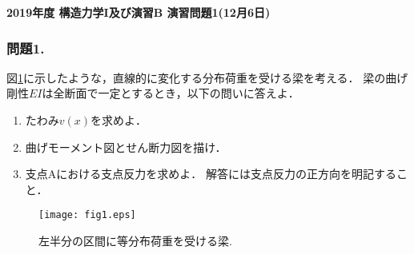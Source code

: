\documentclass[10pt,a4j]{jarticle}
\newlength{\minitwocolumn}
\begin{document}
\newcommand{\fat}[1]{\mbox{\boldmath $#1$}}
\newcommand{\D}{\partial}
\newcommand{\w}{\omega}
\newcommand{\ga}{\alpha}
\newcommand{\gb}{\beta}
\newcommand{\gx}{\xi}
\newcommand{\gz}{\zeta}
\newcommand{\vhat}[1]{\hat{\fat{#1}}}
\newcommand{\spc}{\vspace{0.7\baselineskip}}
\newcommand{\halfspc}{\vspace{0.3\baselineskip}}

\pagestyle{empty}
\newcommand{\twofig}[2]
 {
   \begin{figure}[h]
     \begin{minipage}[t]{\minitwocolumn}
         \begin{center}   #1
         \end{center}
     \end{minipage}
         \hspace{\columnsep}
     \begin{minipage}[t]{\minitwocolumn}
         \begin{center} #2
         \end{center}
     \end{minipage}
   \end{figure}
 }
\begin{center}
{\Large \bf 2019年度 構造力学I及び演習B 演習問題1(12月6日)} \\
\end{center}
\subsubsection*{問題1. }
図\ref{fig:fig1}に示したような，直線的に変化する分布荷重を受ける梁を考える．
梁の曲げ剛性$EI$は全断面で一定とするとき，以下の問いに答えよ．
\begin{enumerate}
\item
	たわみ$v(x)$を求めよ．
\item
	曲げモーメント図とせん断力図を描け．
\item
	支点Aにおける支点反力を求めよ．
	解答には支点反力の正方向を明記すること．
\end{enumerate}
\begin{figure}[h]
	\begin{center}
	\texttt{[image: fig1.eps]} 
	\end{center}
	\vspace{-5mm}
	\caption{左半分の区間に等分布荷重を受ける梁.}
	\label{fig:fig1}
\end{figure}
\end{document}
